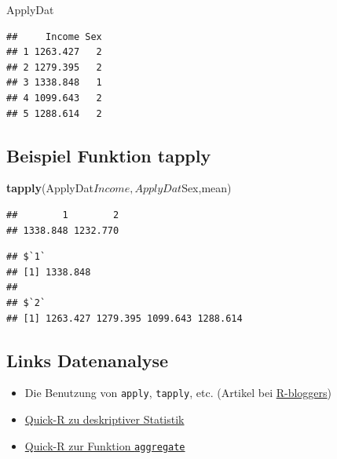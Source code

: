 \documentclass[]{article}
\newenvironment{Shaded}{\begin{snugshade}}{\end{snugshade}}
\newcommand{\KeywordTok}[1]{\textcolor[rgb]{0.13,0.29,0.53}{\textbf{{#1}}}}
\newcommand{\NormalTok}[1]{{#1}}
\begin{document}
\begin{Shaded}
\begin{Highlighting}[]
\NormalTok{ApplyDat}
\end{Highlighting}
\end{Shaded}

\begin{verbatim}
##     Income Sex
## 1 1263.427   2
## 2 1279.395   2
## 3 1338.848   1
## 4 1099.643   2
## 5 1288.614   2
\end{verbatim}

\subsection{Beispiel Funktion tapply}\label{beispiel-funktion-tapply}

\begin{Shaded}
\begin{Highlighting}[]
\KeywordTok{tapply}\NormalTok{(ApplyDat$Income,ApplyDat$Sex,mean)}
\end{Highlighting}
\end{Shaded}

\begin{verbatim}
##        1        2 
## 1338.848 1232.770
\end{verbatim}

\begin{Shaded}
\end{Shaded}

\begin{verbatim}
## $`1`
## [1] 1338.848
## 
## $`2`
## [1] 1263.427 1279.395 1099.643 1288.614
\end{verbatim}

\subsection{Links Datenanalyse}\label{links-datenanalyse}

\begin{itemize}
\item
  Die Benutzung von \texttt{apply}, \texttt{tapply}, etc. (Artikel bei
  \href{http://www.r-bloggers.com/using-apply-sapply-lapply-in-r/}{R-bloggers})
\item
  \href{http://www.statmethods.net/stats/descriptives.html}{Quick-R zu
  deskriptiver Statistik}
\item
  \href{http://www.statmethods.net/management/aggregate.html}{Quick-R
  zur Funktion \texttt{aggregate}}
\end{itemize}
\end{document}
